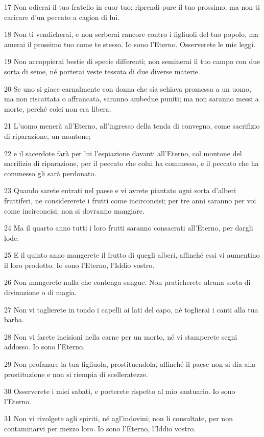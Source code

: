 \par 17 Non odierai il tuo fratello in cuor tuo; riprendi pure il tuo prossimo, ma non ti caricare d'un peccato a cagion di lui.
\par 18 Non ti vendicherai, e non serberai rancore contro i figliuoli del tuo popolo, ma amerai il prossimo tuo come te stesso. Io sono l'Eterno. Osserverete le mie leggi.
\par 19 Non accoppierai bestie di specie differenti; non seminerai il tuo campo con due sorta di seme, né porterai veste tessuta di due diverse materie.
\par 20 Se uno si giace carnalmente con donna che sia schiava promessa a un uomo, ma non riscattata o affrancata, saranno ambedue puniti; ma non saranno messi a morte, perché colei non era libera.
\par 21 L'uomo menerà all'Eterno, all'ingresso della tenda di convegno, come sacrifizio di riparazione, un montone;
\par 22 e il sacerdote farà per lui l'espiazione davanti all'Eterno, col montone del sacrifizio di riparazione, per il peccato che colui ha commesso, e il peccato che ha commesso gli sarà perdonato.
\par 23 Quando sarete entrati nel paese e vi avrete piantato ogni sorta d'alberi fruttiferi, ne considererete i frutti come incirconcisi; per tre anni saranno per voi come incirconcisi; non si dovranno mangiare.
\par 24 Ma il quarto anno tutti i loro frutti saranno consacrati all'Eterno, per dargli lode.
\par 25 E il quinto anno mangerete il frutto di quegli alberi, affinché essi vi aumentino il loro prodotto. Io sono l'Eterno, l'Iddio vostro.
\par 26 Non mangerete nulla che contenga sangue. Non praticherete alcuna sorta di divinazione o di magia.
\par 27 Non vi taglierete in tondo i capelli ai lati del capo, né toglierai i canti alla tua barba.
\par 28 Non vi farete incisioni nella carne per un morto, né vi stamperete segni addosso. Io sono l'Eterno.
\par 29 Non profanare la tua figliuola, prostituendola, affinché il paese non si dia alla prostituzione e non si riempia di scelleratezze.
\par 30 Osserverete i miei sabati, e porterete rispetto al mio santuario. Io sono l'Eterno.
\par 31 Non vi rivolgete agli spiriti, né agl'indovini; non li consultate, per non contaminarvi per mezzo loro. Io sono l'Eterno, l'Iddio vostro.
